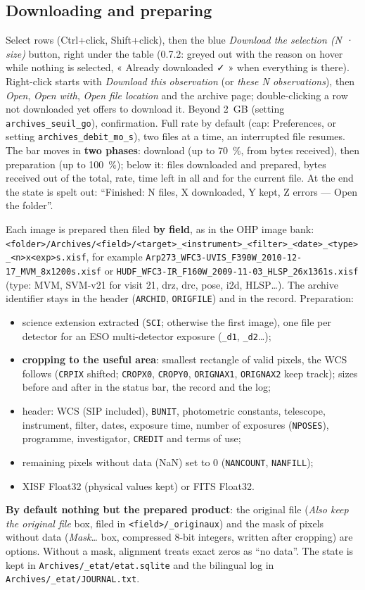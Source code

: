\subsection{Downloading and preparing}
Select rows (Ctrl+click, Shift+click), then the blue \emph{Download the selection (N · size)} button, right under the
table (0.7.2: greyed out with the reason on hover while nothing is selected, « Already downloaded ✓ » when everything
is there). Right-click starts with \emph{Download this observation} (or \emph{these N observations}), then
\emph{Open}, \emph{Open with}, \emph{Open file location} and the archive page; double-clicking a row not downloaded
yet offers to download it. Beyond 2~GB (setting \texttt{archives\_seuil\_go}), confirmation.
Full rate by default (cap: Preferences, or setting \texttt{archives\_debit\_mo\_s}), two files at a time, an interrupted file resumes. The
bar moves in \textbf{two phases}: download (up to 70~\%, from bytes received), then preparation (up to 100~\%); below
it: files downloaded and prepared, bytes received out of the total, rate, time left in all and for the current file.
At the end the state is spelt out: ``Finished: N files, X downloaded, Y kept, Z errors --- Open the folder''.

Each image is prepared then filed \textbf{by field}, as in the OHP image bank:
\texttt{<folder>/Archives/<field>/<target>\_<instrument>\_<filter>\_<date>\_<type>\_<n>x<exp>s.xisf}, for example
\texttt{Arp273\_WFC3-UVIS\_F390W\_2010-12-17\_MVM\_8x1200s.xisf} or
\texttt{HUDF\_WFC3-IR\_F160W\_2009-11-03\_HLSP\_26x1361s.xisf} (type: MVM, SVM-v21 for visit 21, drz, drc, pose, i2d,
HLSP…). The archive identifier stays in the header (\texttt{ARCHID}, \texttt{ORIGFILE}) and in the record.
Preparation:
\begin{itemize}
\item science extension extracted (\texttt{SCI}; otherwise the first image), one file per detector for an ESO
  multi-detector exposure (\texttt{\_d1}, \texttt{\_d2}…);
\item \textbf{cropping to the useful area}: smallest rectangle of valid pixels, the WCS follows (\texttt{CRPIX}
  shifted; \texttt{CROPX0}, \texttt{CROPY0}, \texttt{ORIGNAX1}, \texttt{ORIGNAX2} keep track); sizes before and after
  in the status bar, the record and the log;
\item header: WCS (SIP included), \texttt{BUNIT}, photometric constants, telescope, instrument, filter, dates, exposure
  time, number of exposures (\texttt{NPOSES}), programme, investigator, \texttt{CREDIT} and terms of use;
\item remaining pixels without data (NaN) set to 0 (\texttt{NANCOUNT}, \texttt{NANFILL});
\item XISF Float32 (physical values kept) or FITS Float32.
\end{itemize}
\textbf{By default nothing but the prepared product}: the original file (\emph{Also keep the original file} box, filed
in \texttt{<field>/\_originaux}) and the mask of pixels without data (\emph{Mask…} box, compressed 8-bit integers,
written after cropping) are options. Without a mask, alignment treats exact zeros as ``no data''. The state is kept in
\texttt{Archives/\_etat/etat.sqlite} and the bilingual log in \texttt{Archives/\_etat/JOURNAL.txt}.

